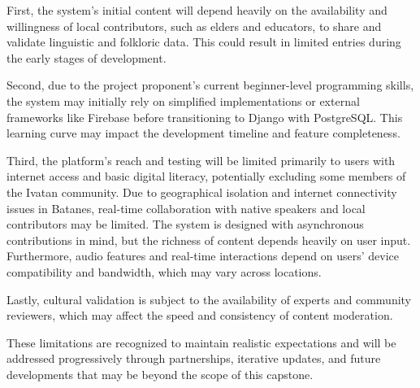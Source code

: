             First, the system's initial content will depend heavily on the availability and willingness of local contributors, such as elders and educators, to share and validate linguistic and folkloric data. This could result in limited entries during the early stages of development.

            Second, due to the project proponent’s current beginner-level programming skills, the system may initially rely on simplified implementations or external frameworks like Firebase before transitioning to Django with PostgreSQL. This learning curve may impact the development timeline and feature completeness.

            Third, the platform’s reach and testing will be limited primarily to users with internet access and basic digital literacy, potentially excluding some members of the Ivatan community. Due to geographical isolation and internet connectivity issues in Batanes, real-time collaboration with native speakers and local contributors may be limited. The system is designed with asynchronous contributions in mind, but the richness of content depends heavily on user input. Furthermore, audio features and real-time interactions depend on users’ device compatibility and bandwidth, which may vary across locations. 

            Lastly, cultural validation is subject to the availability of experts and community reviewers, which may affect the speed and consistency of content moderation.

            These limitations are recognized to maintain realistic expectations and will be addressed progressively through partnerships, iterative updates, and future developments that may be beyond the scope of this capstone.
